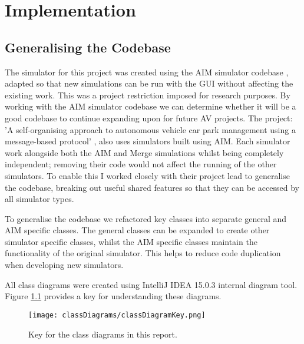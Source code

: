\chapter{Implementation}
\label{cha:Implementation}


\section{Generalising the Codebase}
\label{sec:Generalising the Codebase}
The simulator for this project was created using the AIM simulator codebase \citep{AIMWebsite}, adapted so that new simulations can be run with the GUI without affecting the existing work. This was a project restriction imposed for research purposes. By working with the AIM simulator codebase we can determine whether it will be a good codebase to continue expanding upon for future AV projects. The project: 'A self-organising approach to autonomous vehicle car park management using a message-based protocol' , also uses simulators built using AIM. Each simulator work alongside both the AIM and Merge simulations whilst being completely independent; removing their code would not affect the running of the other simulators. To enable this I worked closely with their project lead to generalise the codebase, breaking out useful shared features so that they can be accessed by all simulator types.



To generalise the codebase we refactored key classes into separate general and AIM specific classes. The general classes can be expanded to create other simulator specific classes, whilst the AIM specific classes maintain the functionality of the original simulator. This helps to reduce code duplication when developing new simulators.

All class diagrams were created using IntelliJ IDEA 15.0.3 internal diagram tool. Figure \ref{fig:classDiagramKey} provides a key for understanding these diagrams.

\begin{figure}[htb]
\texttt{[image: classDiagrams/classDiagramKey.png]}
\caption{Key for the class diagrams in this report.}
\label{fig:classDiagramKey}
\end{figure}



